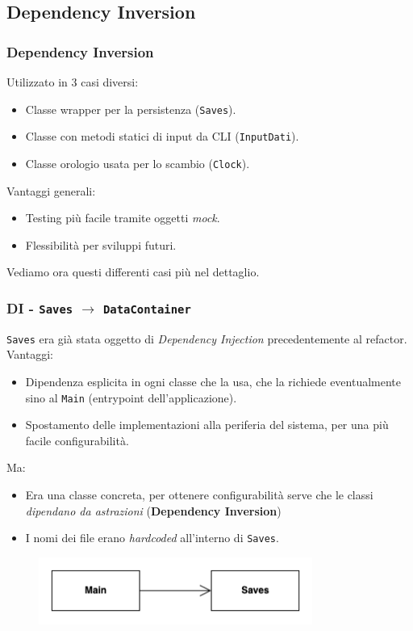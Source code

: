 \subsection{Dependency Inversion}
\beamertitle

\begin{frame}
    \frametitle{Dependency Inversion}
    Utilizzato in 3 casi diversi:
    \begin{itemize}
        \item Classe wrapper per la persistenza (\texttt{Saves}).
        \item Classe con metodi statici di input da CLI (\texttt{InputDati}).
        \item Classe orologio usata per lo scambio (\texttt{Clock}).
    \end{itemize}
    Vantaggi generali:
    \begin{itemize}
        \item {\color{green}Testing più facile} tramite oggetti \emph{mock}.
        \item {\color{green}Flessibilità} per sviluppi futuri.
    \end{itemize}
    Vediamo ora questi differenti casi più nel dettaglio.
\end{frame}

\begin{frame}
    \frametitle{DI - \texttt{Saves} $\to$ \texttt{DataContainer}}
    \texttt{Saves} era già stata oggetto di \emph{Dependency Injection} precedentemente al refactor.
    {\color{green}Vantaggi}:
    \begin{itemize}
        \item {\color{green}Dipendenza esplicita} in ogni classe che la usa, che la richiede eventualmente sino al \texttt{Main}
        (entrypoint dell'applicazione).
        \item Spostamento delle implementazioni alla periferia del sistema, per una più {\color{green}facile configurabilità}.
    \end{itemize}

    Ma:
    \begin{itemize}
        \item Era una {\color{red}classe concreta}, per ottenere configurabilità serve che le classi \emph{dipendano da astrazioni}
        (\textbf{Dependency Inversion})
        \item I nomi dei file erano {\color{red}\emph{hardcoded}} all'interno di \texttt{Saves}.
    \end{itemize}
    \begin{figure}
        \includegraphics[width=0.8\textwidth]{img/dependencyInversion_before.png}
    \end{figure}
\end{frame}

